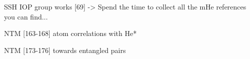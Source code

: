 		SSH IOP group works [69] -> Spend the time to collect all the mHe references you can find...
		
		NTM [163-168] atom correlations with He* 

		NTM [173-176] towards entangled pairs 
			
